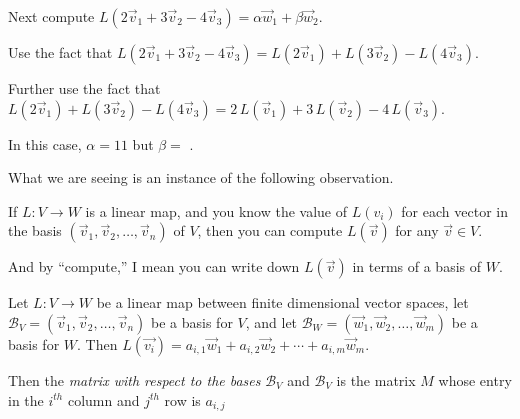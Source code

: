 \documentclass{ximera}
\begin{document}
\begin{question}
    Next compute $L(2\vec{v}_1+3\vec{v}_2-4\vec{v}_3) = \alpha \vec{w}_1 + \beta \vec{w}_2$.
    \begin{solution}
      \begin{hint}
        Use the fact that $L(2\vec{v}_1+3\vec{v}_2-4\vec{v}_3) = L(2\vec{v}_1)+L(3\vec{v}_2)-L(4\vec{v}_3)$.
      \end{hint}

      \begin{hint}
        Further use the fact that $L(2\vec{v}_1)+L(3\vec{v}_2)-L(4\vec{v}_3) = 2 \, L(\vec{v}_1)+3\,L(\vec{v}_2)-4\,L(\vec{v}_3)$.
      \end{hint}

      In this case, $\alpha = 11$ but $\beta =$ .
    \end{solution}

    What we are seeing is an instance of the following observation.

    \begin{observation}
      If $L:V \to W$ is a linear map, and you know the value of $L(v_i)$ for each vector in the basis $(\vec{v}_1,\vec{v}_2,\ldots,\vec{v}_n)$ of $V$, 
      then you can compute $L(\vec{v})$ for any $\vec{v} \in V$.

      And by ``compute,'' I mean you can write down $L(\vec{v})$ in terms of a basis of $W$.
    \end{observation}

\end{question}

\begin{definition}
  Let $L:V \to W$ be a linear map between finite dimensional vector
  spaces, let $\mathcal{B}_V =(\vec{v}_1 ,\vec{v}_2,\ldots,\vec{v}_n) $
  be a basis for $V$, and let $\mathcal{B}_W =
  (\vec{w}_1,\vec{w}_2,\ldots,\vec{w}_m)$ be a basis for $W$.  Then
  $L(\vec{v_i}) = a_{i,1}\vec{w}_1+a_{i,2}\vec{w}_2 + \cdots +
  a_{i,m}\vec{w}_m$.

  Then the \textit{matrix with respect to the bases} $\mathcal{B}_V$
  and $\mathcal{B}_V$ is the matrix $M$ whose entry in the $i^{th}$
  column and $j^{th}$ row is $a_{i,j}$
\end{definition}
\end{document}
